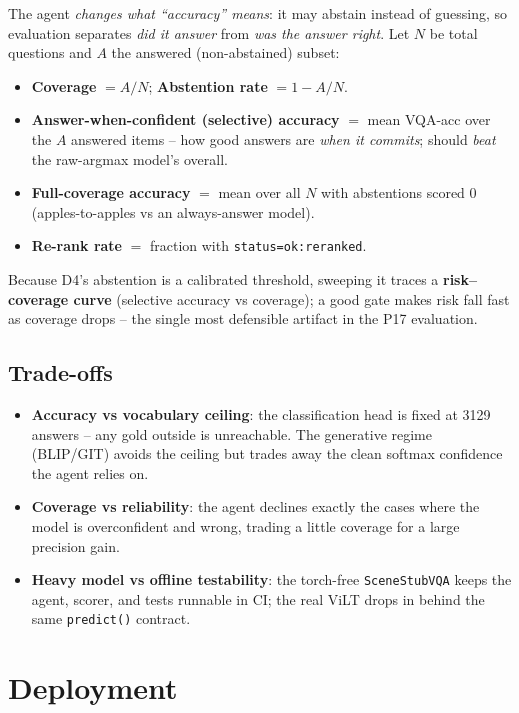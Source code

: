 \documentclass[12pt,a4paper]{article}
\begin{document}
The agent \emph{changes what ``accuracy'' means}: it may abstain instead of guessing, so evaluation separates \emph{did it answer} from \emph{was the answer right}. Let $N$ be total questions and $A$ the answered (non-abstained) subset:
\begin{itemize}\setlength\itemsep{0.1em}
  \item \textbf{Coverage} $= A/N$; \textbf{Abstention rate} $= 1 - A/N$.
  \item \textbf{Answer-when-confident (selective) accuracy} $=$ mean VQA-acc over the $A$ answered items -- how good answers are \emph{when it commits}; should \emph{beat} the raw-argmax model's overall.
  \item \textbf{Full-coverage accuracy} $=$ mean over all $N$ with abstentions scored 0 (apples-to-apples vs an always-answer model).
  \item \textbf{Re-rank rate} $=$ fraction with \texttt{status=ok:reranked}.
\end{itemize}
Because D4's abstention is a calibrated threshold, sweeping it traces a \textbf{risk--coverage curve} (selective accuracy vs coverage); a good gate makes risk fall fast as coverage drops -- the single most defensible artifact in the P17 evaluation.

\subsection{Trade-offs}

\begin{itemize}
  \item \textbf{Accuracy vs vocabulary ceiling}: the classification head is fixed at 3129 answers -- any gold outside is unreachable. The generative regime (BLIP/GIT) avoids the ceiling but trades away the clean softmax confidence the agent relies on.
  \item \textbf{Coverage vs reliability}: the agent declines exactly the cases where the model is overconfident and wrong, trading a little coverage for a large precision gain.
  \item \textbf{Heavy model vs offline testability}: the torch-free \texttt{SceneStubVQA} keeps the agent, scorer, and tests runnable in CI; the real ViLT drops in behind the same \texttt{predict()} contract.
\end{itemize}

\section{Deployment}
\end{document}
